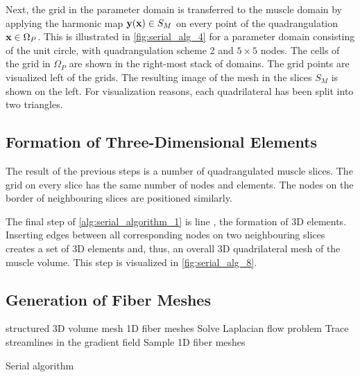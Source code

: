 Next, the grid in the parameter domain is transferred to the muscle domain by applying the harmonic map $\textbf{y}(\textbf{x}) \in S_M$ on every point of the quadrangulation $\textbf{x} \in \Omega_P$. This is illustrated in \cref{fig:serial_alg_4} for a parameter domain consisting of the unit circle, with quadrangulation scheme 2 and $5 \times 5$ nodes. The cells of the grid in $\Omega_P$ are shown in the right-most stack of domains. The grid points are visualized left of the grids. The resulting image of the mesh in the slices $S_M$ is shown on the left. For visualization reasons, each quadrilateral has been split into two triangles.

\subsection{Formation of Three-Dimensional Elements}

The result of the previous steps is a number of quadrangulated muscle slices. The grid on every slice has the same number of nodes and elements. The nodes on the border of neighbouring slices are positioned similarly.

The final step of \cref{alg:serial_algorithm_1} is line , the formation of 3D elements. Inserting edges between all corresponding nodes on two neighbouring slices creates a set of 3D elements and, thus, an overall 3D quadrilateral mesh of the muscle volume. This step is visualized in \cref{fig:serial_alg_8}.

\subsection{Generation of Fiber Meshes}


\begin{algorithm}
  \begin{algorithmic}[1]%
    \Statex{}
    \Require structured 3D volume mesh
    \Ensure 1D fiber meshes
    \Statex
    \State Solve Laplacian flow problem
    \State Trace streamlines in the gradient field
    \State Sample 1D fiber meshes
    \EndProcedure
  \end{algorithmic}%
  \caption{Serial algorithm}%
  \label{alg:serial_algorithm_2}%
\end{algorithm}%



